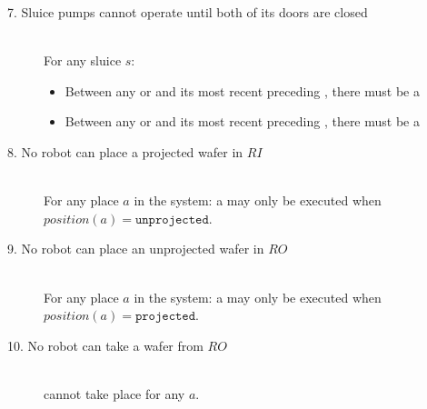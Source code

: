 \begin{description}
\begin{itemize}
 \end{itemize}
 \cbend

 \item[7. Sluice pumps cannot operate until both of its doors are closed] \hfill \\
 For any sluice $s$:
 \begin{itemize}
  \item Between any  or  and its most recent preceding , there must be a 
  \item Between any  or  and its most recent preceding , there must be a 
 \end{itemize}

\item[8. No robot can place a projected wafer in $RI$] \hfill \\
For any place $a$ in the system: a  may only be executed when $position(a) = \texttt{unprojected}$.

\item[9. No robot can place an unprojected wafer in $RO$] \hfill \\
For any place $a$ in the system: a  may only be executed when $position(a) = \texttt{projected}$.

\item[10. No robot can take a wafer from $RO$] \hfill \\
 cannot take place for any $a$.
 
\end{description}
